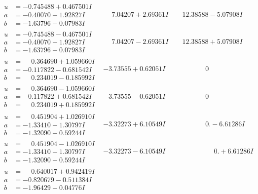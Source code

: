 \documentclass[1p]{elsarticle_modified}
\theoremstyle{definition}
\begin{document}
$$\begin{array}{c|c|c}
\begin{aligned}
u &= -0.745488 + 0.467501 I \\
a &= -0.40070 + 1.92827 I \\
b &= -1.63796 - 0.07983 I\end{aligned}
 & \phantom{-}7.04207 + 2.69361 I & \phantom{-}12.38588 - 5.07908 I \\ \hline\begin{aligned}
u &= -0.745488 - 0.467501 I \\
a &= -0.40070 - 1.92827 I \\
b &= -1.63796 + 0.07983 I\end{aligned}
 & \phantom{-}7.04207 - 2.69361 I & \phantom{-}12.38588 + 5.07908 I \\ \hline\begin{aligned}
u &= \phantom{-}0.364690 + 1.059660 I \\
a &= -0.117822 - 0.681542 I \\
b &= \phantom{-}0.234019 - 0.185992 I\end{aligned}
 & -3.73555 + 0.62051 I & \phantom{-0.000000 } 0 \\ \hline\begin{aligned}
u &= \phantom{-}0.364690 - 1.059660 I \\
a &= -0.117822 + 0.681542 I \\
b &= \phantom{-}0.234019 + 0.185992 I\end{aligned}
 & -3.73555 - 0.62051 I & \phantom{-0.000000 } 0 \\ \hline\begin{aligned}
u &= \phantom{-}0.451904 + 1.026910 I \\
a &= -1.33410 - 1.30797 I \\
b &= -1.32090 - 0.59244 I\end{aligned}
 & -3.32273 + 6.10549 I & \phantom{-0.000000 } 0. - 6.61286 I \\ \hline\begin{aligned}
u &= \phantom{-}0.451904 - 1.026910 I \\
a &= -1.33410 + 1.30797 I \\
b &= -1.32090 + 0.59244 I\end{aligned}
 & -3.32273 - 6.10549 I & \phantom{-0.000000 -}0. + 6.61286 I \\ \hline\begin{aligned}
u &= \phantom{-}0.640017 + 0.942419 I \\
a &= -0.820679 - 0.511384 I \\
b &= -1.96429 - 0.04776 I\end{aligned}

\end{array}$$
\end{document}
